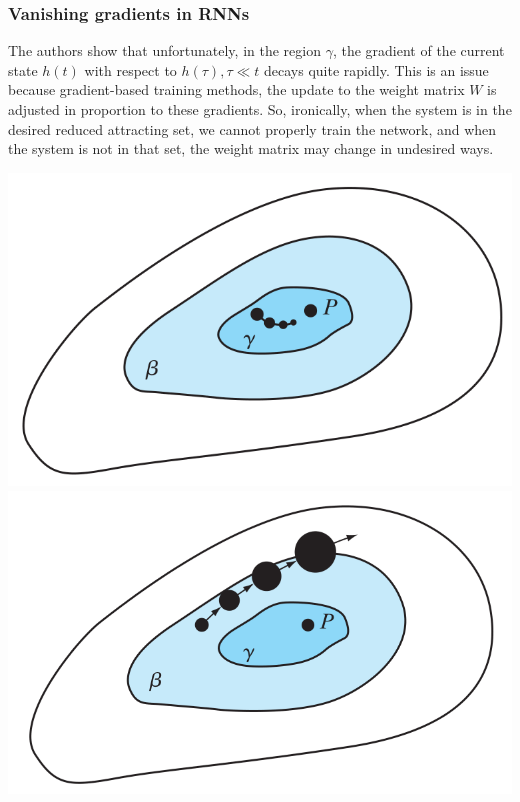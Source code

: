 \documentclass{beamer}
\begin{document}
\begin{frame}
  \frametitle{Vanishing gradients in RNNs}
  The authors show that unfortunately, in the region $\gamma$, the gradient of the current state $h(t)$ with respect to $h(\tau), \tau \ll t$ decays quite rapidly. This is an issue because gradient-based training methods, the update to the weight matrix $W$ is adjusted in proportion to these gradients. So, ironically, when the system is in the desired reduced attracting set, we cannot properly train the network, and when the system is not in that set, the weight matrix may change in undesired ways.

\begin{center}
\includegraphics[scale=0.20]{bengio_picture.png} \includegraphics[scale=0.20]{bengio_picture2.png}
\end{center}

\end{frame}
\end{document}
